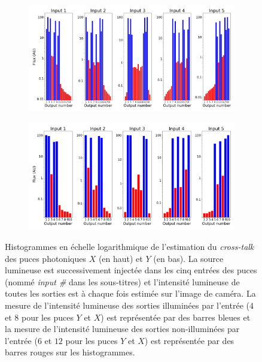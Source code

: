 \begin{figure}[ht!]
    \centering
    \begin{subfigure}{0.9\textwidth}
        \centering
        \includegraphics[width=\textwidth]{Figure_Chap2/20201124_5TC_5OutputFluxesLog_OOptics_LaTex.png}
    \end{subfigure}
    \begin{subfigure}{0.9\textwidth}
        \centering
        \includegraphics[width=\textwidth]{Figure_Chap2/20201119_5TC_5OutputFluxesLog_OOptics_LaTex.png}
    \end{subfigure}
    \caption[Histogrammes de l'estimation du \textit{cross-talk} des puces photoniques $X$ et $Y$.]{Histogrammes en échelle logarithmique de l'estimation du \textit{cross-talk} des puces photoniques $X$ (en haut) et $Y$ (en bas). La source lumineuse est successivement injectée dans les cinq entrées des puces (nommé \textit{input \#} dans les sous-titres) et l'intensité lumineuse de toutes les sorties est à chaque fois estimée sur l'image de caméra. La mesure de l'intensité lumineuse des sorties illuminées par l'entrée ($4$ et $8$ pour les puces $Y$ et $X$) est représentée par des barres bleues et la mesure de l'intensité lumineuse des sorties non-illuminées par l'entrée ($6$ et $12$ pour les puces $Y$ et $X$) est représentée par des barres rouges sur les histogrammes.}
    \label{fig:ChipCrossTalk}
\end{figure}


